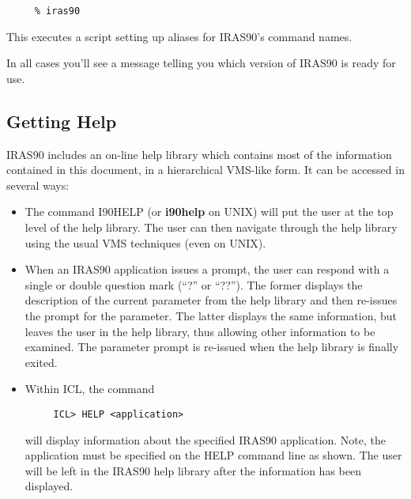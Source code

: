 \small
\begin{verbatim}
     % iras90
\end{verbatim}
\normalsize
This executes a script setting up aliases for {\small IRAS90}'s command names. 

In all cases you'll see a message telling you which version of {\small IRAS90} 
is ready for use. 

\subsection{Getting Help}
{\small IRAS90} includes an on-line help library which contains most of the
information contained in this document, in a hierarchical VMS-like form. It can
be accessed in several ways: 
\begin {itemize} 
\item The command {\small I90HELP} (or {\bf i90help} on {\small UNIX}) will put
the user at the top level of the help library. The user can then navigate
through the help library using the usual {\small VMS} techniques (even on
{\small UNIX}). \item When an {\small IRAS90} application issues a prompt, the
user can respond with a single or double question mark (``?'' or ``??''). The
former displays the description of the current parameter from the help library
and then re-issues the prompt for the parameter. The latter displays the same
information, but leaves the user in the help library, thus allowing other
information to be examined. The parameter prompt is re-issued when the help
library is finally exited. 
\item Within {\small ICL}, the command 

\small
\begin{verbatim}
     ICL> HELP <application>
\end{verbatim}
\normalsize
will display information about the specified {\small IRAS90} application. Note,
the application must be specified on the {\small HELP} command line as shown. The user
will be left in the {\small IRAS90} help library after the information has been
displayed. 
\end{itemize}

